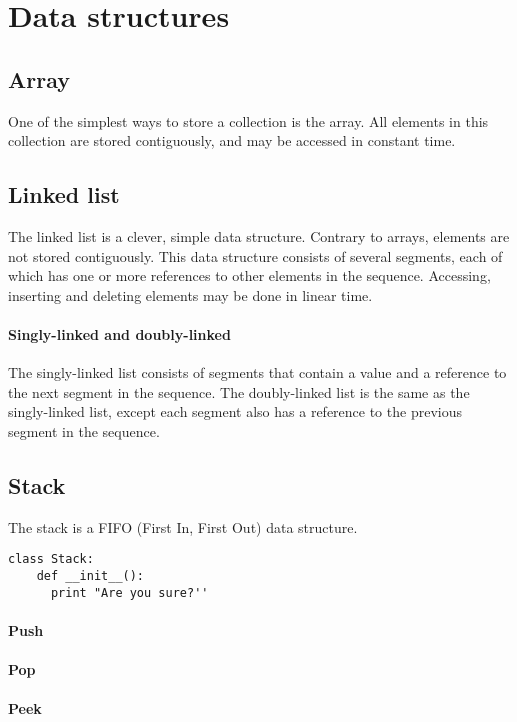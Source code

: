 \documentclass{article}
\begin{document}
\section{Data structures}
\subsection{Array}
One of the simplest ways to store a collection is the array. All elements in this collection are stored contiguously,
and may be accessed in constant time.

\subsection{Linked list}
The linked list is a clever, simple data structure. Contrary to arrays, elements are not stored contiguously.
This data structure consists of several segments, each of which has one or more references to other elements in the sequence.
Accessing, inserting and deleting elements may be done in linear time.

\paragraph{Singly-linked and doubly-linked}
The singly-linked list consists of segments that contain a value and a reference to the next segment in the sequence.
The doubly-linked list is the same as the singly-linked list, except each segment also has a reference to the previous segment in the sequence.

\subsection{Stack}
The stack is a FIFO (First In, First Out) data structure.

\begin{lstlisting}[Language=Python]
  class Stack:
    def __init__():
      print "Are you sure?''
\end{lstlisting}

\paragraph{Push}
\paragraph{Pop}
\paragraph{Peek}
\end{document}
